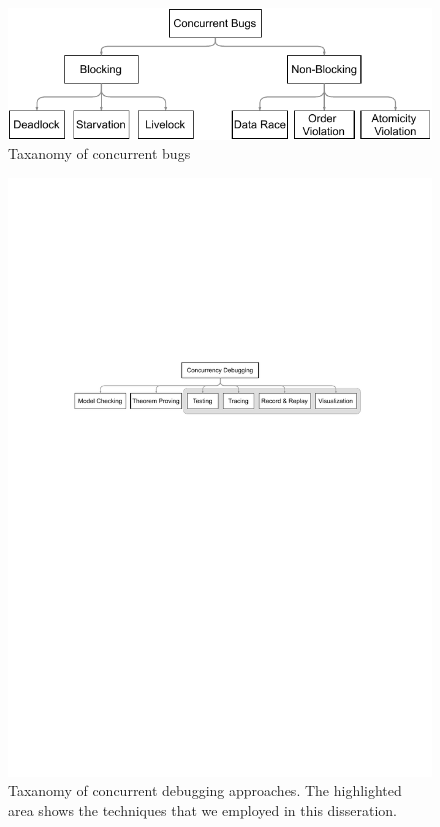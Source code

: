 
\begin{figure}[]
\centering
\includegraphics[width=.9\textwidth]{dissertation_intro_bugs.pdf}
\caption{Taxanomy of concurrent bugs}
\label{fig:ch1_concBugs}
\end{figure}

\begin{figure}[]
\centering
\includegraphics[width=1\textwidth]{dissertation_intro_approaches2.pdf}
\caption{Taxanomy of concurrent debugging approaches. The highlighted area shows the techniques that we employed in this disseration.}
\label{fig:ch1_concDebugging}
\end{figure}
